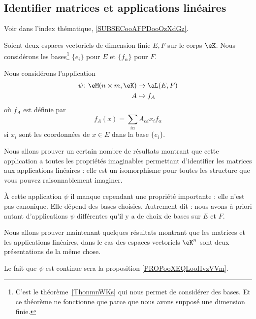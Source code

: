\subsection{Identifier matrices et applications linéaires}

Voir dans l'index thématique, \ref{SUBSECooAFPDooOzXdGz}.

Soient deux espaces vectoriels de dimension finie \( E,F\) sur le corps \( \eK\). Nous considérons les bases\footnote{C'est le théorème~\ref{ThonmnWKs} qui nous permet de considérer des bases. Et ce théorème ne fonctionne que parce que nous avons supposé une dimension finie.} \( \{ e_i \}\) pour \( E\) et \( \{ f_{\alpha} \}\) pour \( F\).

\begin{definition}      \label{DEFooJVOAooUgGKme}
	Nous considérons l'application
	\begin{equation}        \label{EQooVZQWooMyFFeO}
		\begin{aligned}
			\psi\colon \eM(n\times m, \eK) & \to \aL(E,F) \\
			A                              & \mapsto f_A
		\end{aligned}
	\end{equation}
	où \( f_A\) est définie par
	\begin{equation}        \label{EQooBVGHooJhFbMs}
		f_A(x)=\sum_{i\alpha}A_{\alpha i}x_if_{\alpha}
	\end{equation}
	si \( x_i\) sont les coordonnées de \( x\in E\) dans la base \( \{ e_i \}\).
\end{definition}

\begin{normaltext}
	Nous allons prouver un certain nombre de résultats montrant que cette application a toutes les propriétés imaginables permettant d'identifier les matrices aux applications linéaires : elle est un isomorphisme pour toutes les structure que vous pouvez raisonnablement imaginer.

	À cette application \( \psi\) il manque cependant une propriété importante : elle n'est pas canonique. Elle dépend des bases choisies. Autrement dit : nous avons à priori autant d'applications \( \psi\) différentes qu'il y a de choix de bases sur \( E\) et \( F\).

	Nous allons prouver maintenant quelques résultats montrant que les matrices et les applications linéaires, dans le cas des espaces vectoriels \( \eK^n\) sont deux présentations de la même chose.

	Le fait que \( \psi\) est continue sera la proposition \ref{PROPooXEQLooHvzVVm}.
\end{normaltext}

